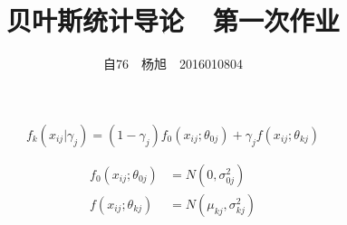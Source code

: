 \documentclass[UTF8]{article}
\title{贝叶斯统计导论\ \ 第一次作业}
\author{自76\ \ 杨旭\ \ 2016010804}
\begin{document}
 \maketitle

\section{}
$$
	f_k(x_{ij}|\gamma_j)=(1-\gamma_j)f_0(x_{ij};\theta_{0j})+\gamma_j f(x_{ij};\theta_{kj})
$$




$$
	\begin{aligned}
	f_0(x_{ij};\theta_{0j})&=N(0,\sigma_{0j}^2)\\
	f(x_{ij};\theta_{kj})&=N(\mu_{kj},\sigma_{kj}^2)
	\end{aligned}
$$
\section{}

\section{}

\section{}
\end{document}
